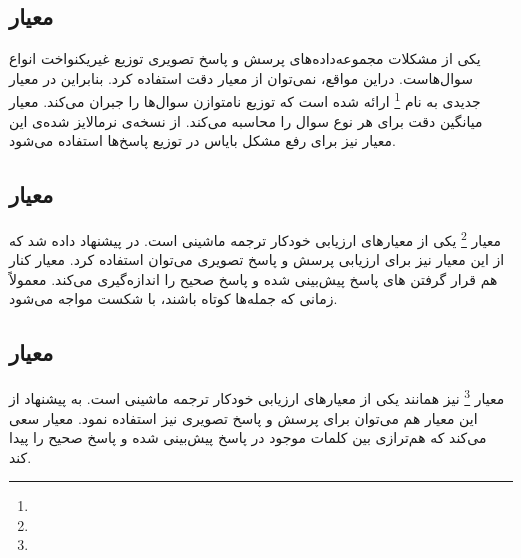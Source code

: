 \subsection{ معیار }

		یکی از مشکلات مجموعه‌داده‌های پرسش و پاسخ تصویری توزیع غیریکنواخت انواع سوال‌هاست. دراین مواقع، نمی‌توان از معیار دقت استفاده کرد. بنابراین  در 
	\cite{kafle2017analysis}
		 معیار جدیدی به نام 
	\footnote{}
		ارائه شده است که توزیع نامتوازن سوال‌ها را جبران می‌کند. معیار 
	میانگین دقت برای هر نوع سوال را محاسبه می‌کند. از نسخه‌ی نرمالایز شده‌ی این معیار نیز برای رفع مشکل بایاس در توزیع پاسخ‌ها استفاده می‌شود.


\subsection{معیار }
معیار
		\cite{papineni2002bleu}
		\footnote{}
		یکی از معیارهای ارزیابی خودکار ترجمه ماشینی است. در
		\cite{gurari2018vizwiz}
		 پیشنهاد داده شد که از این معیار نیز برای ارزیابی پرسش و پاسخ تصویری می‌توان استفاده کرد. معیار 
		کنار هم قرار گرفتن 
		های پاسخ پیش‌‌بینی شده و پاسخ صحیح را اندازه‌گیری می‌کند. معمولاً
	زمانی که جمله‌ها کوتاه باشند، با شکست مواجه می‌‌شود.
		


\subsection{معیار }
معیار
		\cite{denkowski2014meteor}
		\footnote{}
		نیز همانند
	یکی از معیارهای ارزیابی خودکار ترجمه ماشینی است. به پیشنهاد 
	\cite{gurari2018vizwiz}
	 از این معیار هم می‌توان برای پرسش و پاسخ تصویری نیز استفاده نمود. معیار 
		سعی می‌کند که هم‌ترازی بین کلمات موجود در پاسخ پیش‌بینی شده و پاسخ صحیح را پیدا کند.
